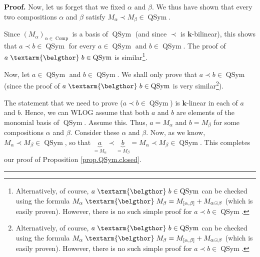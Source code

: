 \documentclass[numbers=enddot,12pt,final,onecolumn,notitlepage,abstracton]{scrartcl}%
\theoremstyle{definition}
\newenvironment{proof}[1][Proof]{\noindent\textbf{#1.} }{\ \rule{0.5em}{0.5em}}
\newenvironment{verlong}{}{}
\newenvironment{vershort}{}{}
\newcommand{\bel}{\left. \textarm{\belgthor} \right.}
\begin{document}
\begin{proof}
Now, let us forget that we fixed $\alpha$ and $\beta$. We thus have shown that
every two compositions $\alpha$ and $\beta$ satisfy $M_{\alpha}\left.
\prec\right.  M_{\beta}\in\operatorname*{QSym}$.

\begin{vershort}
Since $\left(  M_{\alpha}\right)  _{\alpha\in\operatorname*{Comp}}$ is a basis
of $\operatorname*{QSym}$ (and since $\left.  \prec\right.  $ is $\mathbf{k}%
$-bilinear), this shows that $a\left.  \prec\right.  b\in\operatorname*{QSym}$
for every $a\in\operatorname*{QSym}$ and $b\in\operatorname*{QSym}$. The proof
of $a \bel b\in\operatorname*{QSym}$ is similar\footnote{Alternatively, of
course, $a \bel b\in\operatorname*{QSym}$ can be checked using the formula
$M_{\alpha} \bel M_{\beta}=M_{\left[  \alpha,\beta\right]  }+M_{\alpha
\odot\beta}$ (which is easily proven). However, there is no such simple proof
for $a\left.  \prec\right.  b\in\operatorname*{QSym}$.}.
\end{vershort}

\begin{verlong}
Now, let $a\in\operatorname*{QSym}$ and $b\in\operatorname*{QSym}$. We shall
only prove that $a\left.  \prec\right.  b\in\operatorname*{QSym}$ (since the
proof of $a \bel b\in\operatorname*{QSym}$ is very
similar\footnote{Alternatively, of course, $a \bel b\in\operatorname*{QSym}$
can be checked using the formula $M_{\alpha} \bel M_{\beta}=M_{\left[
\alpha,\beta\right]  }+M_{\alpha\odot\beta}$ (which is easily proven).
However, there is no such simple proof for $a\left.  \prec\right.
b\in\operatorname*{QSym}$.}).

The statement that we need to prove ($a\left.  \prec\right.  b\in
\operatorname*{QSym}$) is $\mathbf{k}$-linear in each of $a$ and $b$. Hence,
we can WLOG assume that both $a$ and $b$ are elements of the monomial basis of
$\operatorname*{QSym}$. Assume this. Thus, $a=M_{\alpha}$ and $b=M_{\beta}$
for some compositions $\alpha$ and $\beta$. Consider these $\alpha$ and
$\beta$. Now, as we know, $M_{\alpha}\left.  \prec\right.  M_{\beta}%
\in\operatorname*{QSym}$, so that $\underbrace{a}_{=M_{\alpha}}\left.
\prec\right.  \underbrace{b}_{=M_{\beta}}=M_{\alpha}\left.  \prec\right.
M_{\beta}\in\operatorname*{QSym}$. This completes our proof of Proposition
\ref{prop.QSym.closed}.
\end{verlong}
\end{proof}

\Needspace{6pc}
\end{document}
